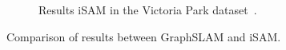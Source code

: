 {\begin{figure}[htbp!]
\begin{subfigure}[b]{0.5\textwidth}
    \caption{Results iSAM in the Victoria Park dataset~\cite{isam}.}
    \label{fig:victoria-isam}
    \end{subfigure}
    \caption{Comparison of results between GraphSLAM and iSAM.}
    \label{fig:victoria-graphslam-isam}
\end{figure}
}

\newpage